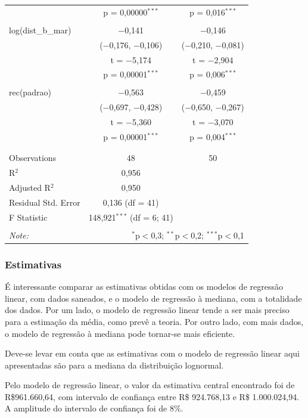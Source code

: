 \documentclass[a4paper, 12pt]{article}
\begin{document}
\begin{table}[!htbp]
\begin{tabular}{@{\extracolsep{5pt}}lcc}
  & p = 0,00000$^{***}$ & p = 0,016$^{***}$ \\ 
  & & \\ 
 log(dist\_b\_mar) & $-$0,141 & $-$0,146 \\ 
  & ($-$0,176, $-$0,106) & ($-$0,210, $-$0,081) \\ 
  & t = $-$5,174 & t = $-$2,904 \\ 
  & p = 0,00001$^{***}$ & p = 0,006$^{***}$ \\ 
  & & \\ 
 rec(padrao) & $-$0,563 & $-$0,459 \\ 
  & ($-$0,697, $-$0,428) & ($-$0,650, $-$0,267) \\ 
  & t = $-$5,360 & t = $-$3,070 \\ 
  & p = 0,00001$^{***}$ & p = 0,004$^{***}$ \\ 
  & & \\ 
\hline \\[-1.8ex] 
Observations & 48 & 50 \\ 
R$^{2}$ & 0,956 &  \\ 
Adjusted R$^{2}$ & 0,950 &  \\ 
Residual Std. Error & 0,136 (df = 41) &  \\ 
F Statistic & 148,921$^{***}$ (df = 6; 41) &  \\ 
\hline 
\hline \\[-1.8ex] 
\textit{Note:}  & \multicolumn{2}{r}{$^{*}$p$<$0,3; $^{**}$p$<$0,2; $^{***}$p$<$0,1} \\ 
\end{tabular} 
\end{table}

\hypertarget{estimativas}{%
\subsubsection{Estimativas}\label{estimativas}}

É interessante comparar as estimativas obtidas com os modelos de
regressão linear, com dados saneados, e o modelo de regressão à mediana,
com a totalidade dos dados. Por um lado, o modelo de regressão linear
tende a ser mais preciso para a estimação da média, como prevê a teoria.
Por outro lado, com mais dados, o modelo de regressão à mediana pode
tornar-se mais eficiente.

Deve-se levar em conta que as estimativas com o modelo de regressão
linear aqui apresentadas são para a mediana da distribuição lognormal.

Pelo modelo de regressão linear, o valor da estimativa central
encontrado foi de R\$961.660,64, com intervalo de confiança entre R\$
924.768,13 e R\$ 1.000.024,94. A amplitude do intervalo de confiança foi
de 8\%.
\end{document}
